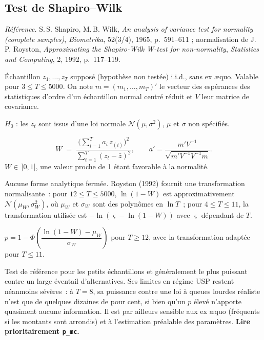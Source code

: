 \documentclass[a4paper,11pt]{article}
\newcommand{\code}[1]{\texttt{\small #1}}
\newcommand{\refl}[1]{{\small\textcolor{maincolor!70!black}{\textit{Référence.} #1}}\par\smallskip}
\newcounter{ficheid}
\newenvironment{fiche}[1]{%
  \stepcounter{ficheid}%
  \phantomsection
  \subsection{#1}%
  \label{fiche:\theficheid}%
}{%
  \end{description}\vspace{0.5em}%
}
\newcommand{\Cadre}{%
  \begin{description}[leftmargin=0pt, style=unboxed, itemsep=3pt, topsep=3pt, parsep=2pt]%
  \item[\textcolor{financeblue}{\textbf{1. Cadre, notations et hypothèses de validité (non testées).}}]}
\newcommand{\Hzero}{\item[\textcolor{financeblue}{\textbf{2. Hypothèse nulle.}}]}
\newcommand{\Stat}{\item[\textcolor{financeblue}{\textbf{3. Statistique de test.}}]}
\newcommand{\Loi}{\item[\textcolor{financeblue}{\textbf{4. Loi sous $H_0$.}}]}
\newcommand{\Pval}{\item[\textcolor{financeblue}{\textbf{5. p-value.}}]}
\newcommand{\Usage}{\item[\textcolor{financeblue}{\textbf{6. Usage et limites.}}]}
\begin{document}
\begin{fiche}{Test de Shapiro--Wilk}
\refl{S.\,S. Shapiro, M.\,B. Wilk, \emph{An analysis of variance test for normality (complete
samples)}, \emph{Biometrika}, 52(3/4), 1965, p.~591--611 ; normalisation de J.\,P. Royston,
\emph{Approximating the Shapiro-Wilk W-test for non-normality}, \emph{Statistics and Computing},
2, 1992, p.~117--119.}
\Cadre
Échantillon $z_1,\dots,z_T$ supposé (hypothèse non testée) i.i.d., sans ex \ae quo. Valable pour
$3 \le T \le 5000$. On note $m = (m_1,\dots,m_T)'$ le vecteur des espérances des statistiques
d'ordre d'un échantillon normal centré réduit et $V$ leur matrice de covariance.
\Hzero
$H_0$ : les $z_t$ sont issus d'une loi normale $\mathcal{N}(\mu,\sigma^2)$, $\mu$ et $\sigma$ non
spécifiés.
\Stat
\[
  W \;=\; \frac{\Big(\sum_{i=1}^{T} a_i\, z_{(i)}\Big)^{2}}{\sum_{t=1}^{T} (z_t - \bar z)^2},
  \qquad
  a' = \frac{m' V^{-1}}{\sqrt{m' V^{-1} V^{-1} m}} .
\]
$W \in\, ]0,1]$, une valeur proche de 1 étant favorable à la normalité.
\Loi
Aucune forme analytique fermée. Royston (1992) fournit une transformation normalisante~: pour
$12 \le T \le 5000$, $\ln(1-W)$ est approximativement $\mathcal{N}(\mu_W, \sigma_W^2)$, où $\mu_W$
et $\sigma_W$ sont des polynômes en $\ln T$~; pour $4 \le T \le 11$, la transformation utilisée
est $-\ln(\varsigma - \ln(1-W))$ avec $\varsigma$ dépendant de $T$.
\Pval
$p = 1 - \Phi\!\left(\dfrac{\ln(1-W) - \mu_W}{\sigma_W}\right)$ pour $T \ge 12$, avec la
transformation adaptée pour $T \le 11$.
\Usage
Test de référence pour les petits échantillons et généralement le plus puissant contre un large
éventail d'alternatives. Ses limites en régime USP restent néanmoins sévères~: à $T = 8$, sa
puissance contre une loi à queues lourdes réaliste n'est que de quelques dizaines de pour cent,
si bien qu'un $p$ élevé n'apporte quasiment aucune information. Il est par ailleurs sensible aux
ex \ae quo (fréquents si les montants sont arrondis) et à l'estimation préalable des paramètres.
\textbf{Lire prioritairement \code{p\_mc}.}
\end{fiche}
\end{document}
